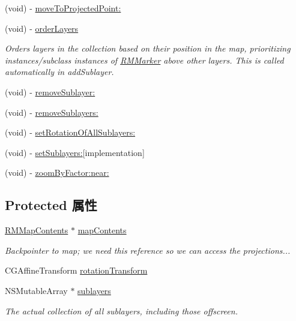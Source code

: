 \begin{DoxyCompactItemize}
(void) -\/ \hyperlink{interface_r_m_layer_collection_a34b34155a7d8dce54d35f8aca4346753}{move\-To\-Projected\-Point\-:}
\item 
(void) -\/ \hyperlink{interface_r_m_layer_collection_ac3857e4b024b2082e1934100aed5812c}{order\-Layers}
\begin{DoxyCompactList}\small\item\em Orders layers in the collection based on their position in the map, prioritizing instances/subclass instances of \hyperlink{interface_r_m_marker}{R\-M\-Marker} above other layers. This is called automatically in add\-Sublayer. \end{DoxyCompactList}\item 
(void) -\/ \hyperlink{interface_r_m_layer_collection_ab62813f526b09f2cff2ed323a2d4ade2}{remove\-Sublayer\-:}
\item 
(void) -\/ \hyperlink{interface_r_m_layer_collection_a46bd39dc6a8d9f35e76c87d681c0bb94}{remove\-Sublayers\-:}
\item 
(void) -\/ \hyperlink{interface_r_m_layer_collection_a903f17c4dfd80c96c8634eec45d60d51}{set\-Rotation\-Of\-All\-Sublayers\-:}
\item 
(void) -\/ \hyperlink{interface_r_m_layer_collection_a31a344ea9ba7e22761850589700b2fcf}{set\-Sublayers\-:}{\ttfamily  \mbox{[}implementation\mbox{]}}
\item 
(void) -\/ \hyperlink{interface_r_m_layer_collection_ade8dc9cb544571522ee47b35e124ac8e}{zoom\-By\-Factor\-:near\-:}
\end{DoxyCompactItemize}
\subsection*{Protected 属性}
\begin{DoxyCompactItemize}
\item 
\hyperlink{interface_r_m_map_contents}{R\-M\-Map\-Contents} $\ast$ \hyperlink{interface_r_m_layer_collection_ae66eb12ed40578ff23f20e54b28cfdb2}{map\-Contents}
\begin{DoxyCompactList}\small\item\em Backpointer to map; we need this reference so we can access the projections... \end{DoxyCompactList}\item 
C\-G\-Affine\-Transform \hyperlink{interface_r_m_layer_collection_a4586e34b2b33538246475b41e17d8534}{rotation\-Transform}
\item 
N\-S\-Mutable\-Array $\ast$ \hyperlink{interface_r_m_layer_collection_ae0741a32da2070098e364aac1c181256}{sublayers}
\begin{DoxyCompactList}\small\item\em The actual collection of all sublayers, including those offscreen. \end{DoxyCompactList}\end{DoxyCompactItemize}



